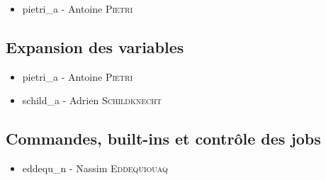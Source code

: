 \begin{itemize}
    \item pietri\_a - Antoine \textsc{Pietri}
\end{itemize}

\subsection{Expansion des variables}

\begin{itemize}
    \item pietri\_a - Antoine \textsc{Pietri}
    \item schild\_a - Adrien \textsc{Schildknecht}
\end{itemize}

\subsection{Commandes, built-ins et contrôle des jobs}

\begin{itemize}
    \item eddequ\_n - Nassim \textsc{Eddequiouaq}
\end{itemize}
